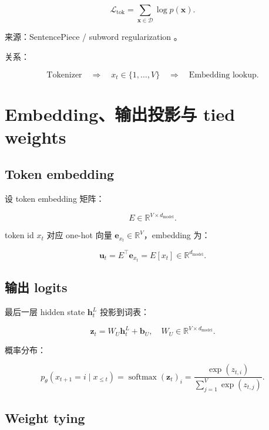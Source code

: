 \documentclass[UTF8,12pt]{ctexart}
\newcommand{\R}{\mathbb{R}}
\newcommand{\1}{\mathbf{1}}
\newcommand{\softmax}{\operatorname{softmax}}
\begin{document}
\begin{equation}
\mathcal{L}_{\mathrm{tok}}
=\sum_{\bm{x}\in\mathcal{D}}\log p(\bm{x}).
\end{equation}

来源：SentencePiece / subword regularization \cite{kudo2018sentencepiece,kudo2018subword}。

关系：

\[
\text{Tokenizer}
\quad\Longrightarrow\quad
x_t\in\{1,\dots,V\}
\quad\Longrightarrow\quad
\text{Embedding lookup}.
\]

\section{Embedding、输出投影与 tied weights}

\subsection{Token embedding}

设 token embedding 矩阵：

\begin{equation}
E\in\R^{V\times d_{\mathrm{model}}}.
\end{equation}

token id $x_t$ 对应 one-hot 向量 $\bm{e}_{x_t}\in\R^V$，embedding 为：

\begin{equation}
\bm{u}_t=E^\top \bm{e}_{x_t}
=E[x_t]\in\R^{d_{\mathrm{model}}}.
\end{equation}

\subsection{输出 logits}

最后一层 hidden state $\bm{h}_t^L$ 投影到词表：

\begin{equation}
\bm{z}_t=W_U \bm{h}_t^L+\bm{b}_U,
\quad
W_U\in\R^{V\times d_{\mathrm{model}}}.
\end{equation}

概率分布：

\begin{equation}
p_\theta(x_{t+1}=i\mid x_{\le t})
=\softmax(\bm{z}_t)_i
=\frac{\exp(z_{t,i})}{\sum_{j=1}^{V}\exp(z_{t,j})}.
\label{eq:softmax}
\end{equation}

\subsection{Weight tying}
\end{document}
